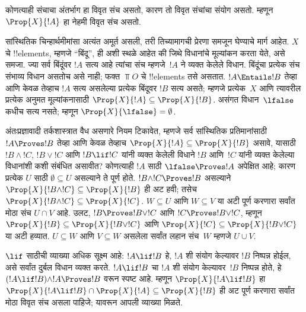 \documentclass[../../../include/open-logic-section]{subfiles}
\begin{document}
कोणत्याही संचाचा अंतर्भाग हा विवृत संच असतो,
कारण तो विवृत संचांचा संयोग असतो. म्हणून
$\Prop{X}{!A}$ हा नेहमी विवृत संच असतो.

सांस्थितिक चिन्हार्थमीमांसा अत्यंत अमूर्त
असली, तरी तिच्यामागची प्रेरणा समजून घेण्याचे
मार्ग आहेत. $X$ चे !!{element}s, म्हणजे
“बिंदू”, ही अशी स्थळे आहेत की जिथे विधानांचे
मूल्यांकन करता येते, असे समजा. ज्या सर्व
बिंदूंवर $!A$ सत्य आहे त्यांचा संच म्हणजे~$!A$
ने व्यक्त केलेले विधान. बिंदूंचा प्रत्येक संच
संभाव्य विधान असतोच असे नाही; फक्त $\Top{O}$ चे
!!{element}s तसे असतात. $!A \Entails !B$
तेव्हा आणि केवळ तेव्हाच $!A$ सत्य असलेल्या
प्रत्येक बिंदूवर $!B$ सत्य असते; म्हणजे
प्रत्येक~$X$ आणि त्यावरील प्रत्येक अनुमत मूल्यांकनासाठी $\Prop{X}{!A}
\subseteq \Prop{X}{!B}$. असंगत विधान~$\lfalse$
कधीच सत्य नसते; म्हणून
$\Prop{X}{\lfalse} = \emptyset$.

अंतःप्रज्ञावादी तर्कशास्त्रात वैध असणारे
नियम टिकावेत, म्हणजे सर्व सांस्थितिक प्रतिमानांसाठी
$!A \Proves !B$ तेव्हा आणि केवळ तेव्हाच
$\Prop{X}{!A} \subseteq \Prop{X}{!B}$
असावे, यासाठी $!B \land !C$,
$!B \lor !C$ आणि $!B \lif !C$ यांनी
व्यक्त केलेली विधाने $!B$ आणि~$!C$
यांनी व्यक्त केलेल्या विधानांशी कशी संबंधित
असावीत? कोणत्याही $!A$ साठी
$\lfalse \Proves !A$ अपेक्षित आहे; कारण
प्रत्येक $U$ साठी $\emptyset
\subseteq U$ असल्याने ते पूर्ण होते.
$!B \land !C \Proves !B$ असल्याने
$\Prop{X}{!B \land !C} \subseteq \Prop{X}{!B}$
ही अट हवी; तसेच
$\Prop{X}{!B \land !C} \subseteq \Prop{X}{!C}$.
$W \subseteq U$ आणि $W \subseteq V$
या अटी पूर्ण करणारा सर्वांत मोठा संच
$U \cap V$ आहे. उलट,
$!B \Proves !B \lor !C$ आणि
$!C \Proves !B \lor !C$, म्हणून
$\Prop{X}{!B} \subseteq \Prop{X}{!B \lor !C}$
आणि $\Prop{X}{!C} \subseteq \Prop{X}{!B \lor !C}$
या अटी हव्यात. $U \subseteq W$ आणि
$V \subseteq W$ असलेला सर्वांत लहान
संच~$W$ म्हणजे $U \cup V$.

$\lif$ साठीची व्याख्या अधिक सूक्ष्म आहे:
$!A \lif !B$ हे, $!A$ शी संयोग केल्यावर
$!B$ निष्पन्न होईल, असे सर्वांत दुर्बल
विधान व्यक्त करते. $!A \lif !B$ चा
$!A$ शी संयोग केल्यावर~$!B$ निष्पन्न होते,
हे $(!A \lif !B)
\land !A \Proves !B $ वरून स्पष्ट आहे.
म्हणून $\Prop{X}{!A \lif !B}$ हा
$\Prop{X}{!A \lif !B} \cap \Prop{X}{!A}
\subseteq \Prop{X}{!B}$ ही अट पूर्ण करणारा
सर्वांत मोठा विवृत संच असला पाहिजे;
यावरून आपली व्याख्या मिळते.
\end{document}
